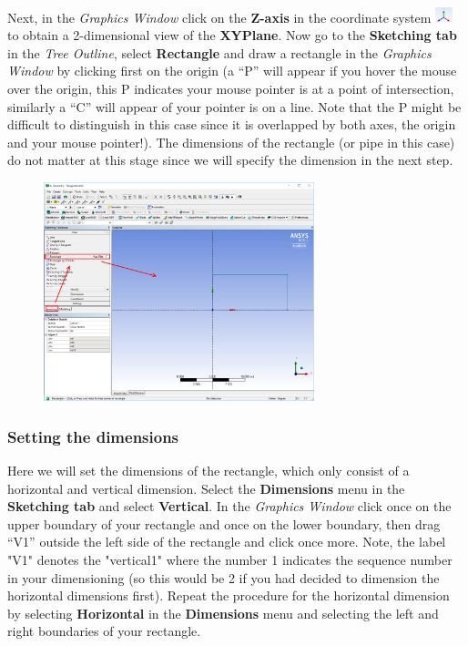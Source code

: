 \documentclass[11pt,a4paper,oneside]{scrartcl}
\newcommand\bfr[1]{\textcolor[rgb]{1,0.00,0.00}{\textbf{\textsf{#1}}}}
\begin{document}
Next, in the \emph{Graphics Window} click on the \bfr{Z-axis} in the coordinate system \includegraphics[width=0.5cm,clip]{axes.png} to obtain a 2-dimensional view of the \bfr{XYPlane}. Now go to the \bfr{Sketching tab} in the \emph{Tree Outline}, select \bfr{Rectangle} and draw a rectangle in the \emph{Graphics Window} by clicking first on the origin (a ``P'' will appear if you hover the mouse over the origin, this P indicates your mouse pointer is at a point of intersection, similarly a ``C'' will appear of your pointer is on a line. Note that the P might be difficult to distinguish in this case since it is overlapped by both axes, the origin and your mouse pointer!). The dimensions of the rectangle (or pipe in this case) do not matter at this stage since we will specify the dimension in the next step.

\begin{figure}[H]
\begin{center}
\includegraphics[width=0.7\textwidth,clip]{draw_rectangle.png}
\end{center}
\end{figure}

\subsubsection{Setting the dimensions}
Here we will set the dimensions of the rectangle, which only consist of a horizontal and vertical dimension. Select the \bfr{Dimensions} menu in the \bfr{Sketching tab} and select \bfr{Vertical}. In the \emph{Graphics Window} click once on the upper boundary of your rectangle and once on the lower boundary, then drag  ``V1'' outside the left side of the rectangle and click once more. Note, the label "V1"  denotes the "vertical1" where the number 1 indicates the sequence number in your dimensioning (so this would be 2 if you had decided to dimension the horizontal dimensions first). Repeat the procedure for the horizontal dimension by selecting \bfr{Horizontal} in the \bfr{Dimensions} menu and selecting the left and right boundaries of your rectangle.
\end{document}
